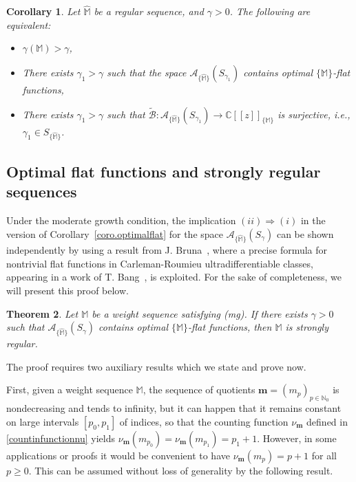 \documentclass[11pt,a4paper]{article}
\theoremstyle{plain}
\newtheorem{theo}{Theorem}[section]
\newtheorem{coro}[theo]{Corollary}
\theoremstyle{definition}
\newcommand{\N}{\mathbb{N}}
\newcommand{\C}{\mathbb{C}}
\newcommand{\M}{\mathbb{M}}
\newcommand{\hM}{\widehat{\M}}
\newcommand{\m}{\boldsymbol{m}}
\def\ga{\gamma}
\begin{document}
\begin{coro}\label{coro.optimalflat0}
Let $\hM$ be a regular sequence,
and $\ga>0$. The following are equivalent:
\begin{itemize}
\item[$(i)$] $\gamma(\M)>\gamma$,

\item[$(ii)$] There exists $\gamma_1>\gamma$ such that the space $\mathcal{A}_{\{\hM\}}(S_{\gamma_1})$ contains optimal $\{\M\}$-flat functions,

\item[$(iii)$] There exists $\gamma_1>\gamma$ such that $\widetilde{\mathcal{B}}:\mathcal{A}_{\{\hM\}}(S_{\gamma_1})\to \C[[z]]_{\{\M\}}$ is surjective, i.e., $\gamma_1\in S_{\{\hM\}}$.
\end{itemize}
\end{coro}

\subsection{Optimal flat functions and strongly regular sequences}

Under the moderate growth condition,
the implication $(ii)\Rightarrow(i)$ in the version of Corollary~\ref{coro.optimalflat} for the space $\mathcal{A}_{\{\hM\}}(S_{\gamma})$
can be shown independently by using a result from J. Bruna~\cite{Brunaext80}, where a precise formula for nontrivial flat functions in Carleman-Roumieu ultradifferentiable classes, appearing in a work of T. Bang~\cite{Bang53}, is exploited. For the sake of completeness, we will present this proof below.

\begin{theo}\label{teor.optimalflat1}
Let $\M$ be a weight sequence satisfying (mg). If there exists $\gamma>0$ such that $\mathcal{A}_{\{\hM\}}(S_{\gamma})$ contains optimal $\{\M\}$-flat functions, then $\M$ is strongly regular.
\end{theo}

The proof requires two auxiliary results which we state and prove now.

First, given a weight sequence $\M$, the sequence of quotients $\m=(m_p)_{p\in\N_0}$ is nondecreasing and tends to infinity, but it can happen that it remains constant on large intervals $[p_0,p_1]$ of indices, so that the counting function $\nu_{\m}$ defined in \eqref{countinfunctionnu} yields $\nu_{\m}(m_{p_0})=\nu_{\m}(m_{p_1})=p_1+1$. However, in some applications or proofs it would be convenient to have $\nu_{\m}(m_p)=p+1$ for all $p\ge 0$. This can be assumed without loss of generality by the following result.
\end{document}

